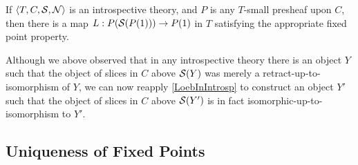 \begin{corollary}\label{LoebInIntrosp}
If $\langle T, C, \mathcal{S}, \mathcal{N} \rangle$ is an introspective theory, and $P$ is any $T$-small presheaf upon $C$, then there is a map $L : P(\mathcal{S}(P(1))) \to P(1)$ in $T$ satisfying the appropriate fixed point property.
\end{corollary}

\begin{observation}
Although we above observed that in any introspective theory there is an object $Y$ such that the object of slices in $C$ above $\mathcal{S}(Y)$ was merely a retract-up-to-isomorphism of $Y$, we can now reapply \cref{LoebInIntrosp} to construct an object $Y'$ such that the object of slices in $C$ above $\mathcal{S}(Y')$ is in fact isomorphic-up-to-isomorphism to $Y'$. 
\end{observation}

\subsection{Uniqueness of Fixed Points}

